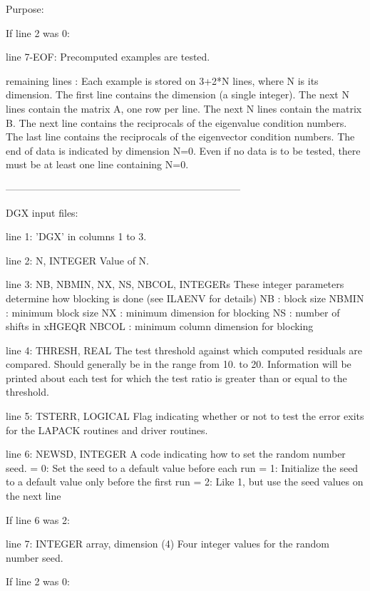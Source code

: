 \begin{DoxyParagraph}{Purpose\+: }
\begin{DoxyVerb}
 If line 2 was 0:

 line 7-EOF: Precomputed examples are tested.

 remaining lines : Each example is stored on 3+2*N lines, where N is
          its dimension. The first line contains the dimension (a
          single integer). The next N lines contain the matrix A, one
          row per line. The next N lines contain the matrix B.  The
          next line contains the reciprocals of the eigenvalue
          condition numbers.  The last line contains the reciprocals of
          the eigenvector condition numbers.  The end of data is
          indicated by dimension N=0.  Even if no data is to be tested,
          there must be at least one line containing N=0.

-----------------------------------------------------------------------

 DGX input files:

 line 1:  'DGX' in columns 1 to 3.

 line 2:  N, INTEGER
          Value of N.

 line 3:  NB, NBMIN, NX, NS, NBCOL, INTEGERs
          These integer parameters determine how blocking is done
          (see ILAENV for details)
          NB     : block size
          NBMIN  : minimum block size
          NX     : minimum dimension for blocking
          NS     : number of shifts in xHGEQR
          NBCOL  : minimum column dimension for blocking

 line 4:  THRESH, REAL
          The test threshold against which computed residuals are
          compared. Should generally be in the range from 10. to 20.
          Information will be printed about each test for which the
          test ratio is greater than or equal to the threshold.

 line 5:  TSTERR, LOGICAL
          Flag indicating whether or not to test the error exits for
          the LAPACK routines and driver routines.

 line 6:  NEWSD, INTEGER
          A code indicating how to set the random number seed.
          = 0:  Set the seed to a default value before each run
          = 1:  Initialize the seed to a default value only before the
                first run
          = 2:  Like 1, but use the seed values on the next line

 If line 6 was 2:

 line 7: INTEGER array, dimension (4)
          Four integer values for the random number seed.

 If line 2 was 0:


\end{DoxyVerb}
\end{DoxyParagraph}
